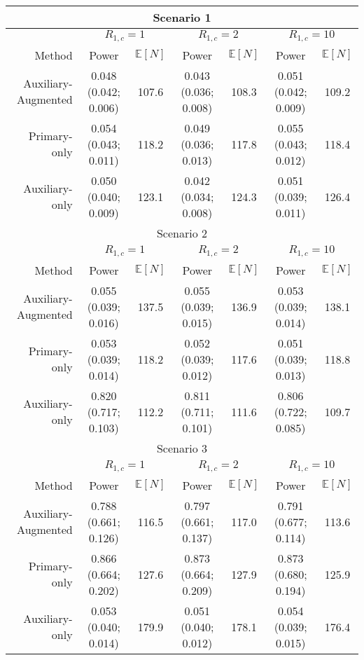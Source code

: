 \begin{tabular}{r|cc|cc|cc} 
\toprule 
\multicolumn{7}{c}{Scenario 1}\\ 
\midrule 
& \multicolumn{2}{c}{$R_{1,c}= 1$} & \multicolumn{2}{c}{$R_{1,c} = 2$} & \multicolumn{2}{c}{$R_{1,c} = 10$} \\ 
Method &  Power &   $\mathbb E[N]$ &
               Power &   $\mathbb E[N]$ &
               Power &   $\mathbb E[N]$  \\ 
Auxiliary-Augmented &0.048  (0.042; 0.006) & 107.6 &0.043  (0.036; 0.008) & 108.3 &0.051  (0.042; 0.009) & 109.2 \\ 
Primary-only &0.054  (0.043; 0.011) & 118.2 &0.049  (0.036; 0.013) & 117.8 &0.055  (0.043; 0.012) & 118.4 \\ 
Auxiliary-only &0.050  (0.040; 0.009) & 123.1 &0.042  (0.034; 0.008) & 124.3 &0.051  (0.039; 0.011) & 126.4 \\ 
\bottomrule 
\multicolumn{7}{c}{Scenario 2}\\ 
\midrule 
& \multicolumn{2}{c}{$R_{1,c}= 1$} & \multicolumn{2}{c}{$R_{1,c} = 2$} & \multicolumn{2}{c}{$R_{1,c} = 10$} \\ 
Method &  Power &   $\mathbb E[N]$ &
               Power &   $\mathbb E[N]$ &
               Power &   $\mathbb E[N]$  \\ 
Auxiliary-Augmented &0.055  (0.039; 0.016) & 137.5 &0.055  (0.039; 0.015) & 136.9 &0.053  (0.039; 0.014) & 138.1 \\ 
Primary-only &0.053  (0.039; 0.014) & 118.2 &0.052  (0.039; 0.012) & 117.6 &0.051  (0.039; 0.013) & 118.8 \\ 
Auxiliary-only &0.820  (0.717; 0.103) & 112.2 &0.811  (0.711; 0.101) & 111.6 &0.806  (0.722; 0.085) & 109.7 \\ 
\bottomrule 
\multicolumn{7}{c}{Scenario 3}\\ 
\midrule 
& \multicolumn{2}{c}{$R_{1,c}= 1$} & \multicolumn{2}{c}{$R_{1,c} = 2$} & \multicolumn{2}{c}{$R_{1,c} = 10$} \\ 
Method &  Power &   $\mathbb E[N]$ &
               Power &   $\mathbb E[N]$ &
               Power &   $\mathbb E[N]$  \\ 
Auxiliary-Augmented &0.788  (0.661; 0.126) & 116.5 &0.797  (0.661; 0.137) & 117.0 &0.791  (0.677; 0.114) & 113.6 \\ 
Primary-only &0.866  (0.664; 0.202) & 127.6 &0.873  (0.664; 0.209) & 127.9 &0.873  (0.680; 0.194) & 125.9 \\ 
Auxiliary-only &0.053  (0.040; 0.014) & 179.9 &0.051  (0.040; 0.012) & 178.1 &0.054  (0.039; 0.015) & 176.4 \\ 

\end{tabular}
